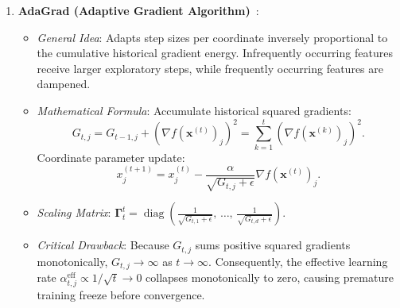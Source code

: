 \begin{enumerate}
  \item \textbf{AdaGrad (Adaptive Gradient Algorithm)}~\cite{duchi2011adaptive}:
    \begin{itemize}[noitemsep]
      \item \textit{General Idea}: Adapts step sizes per coordinate inversely proportional to the cumulative historical gradient energy. Infrequently occurring features receive larger exploratory steps, while frequently occurring features are dampened.
      \item \textit{Mathematical Formula}:
        Accumulate historical squared gradients:
        \begin{equation}
        G_{t, j} = G_{t-1, j} + \left( \nabla f(\mathbf{x}^{(t)})_j \right)^2 = \sum_{k=1}^t \left( \nabla f(\mathbf{x}^{(k)})_j \right)^2.
        \end{equation}
        Coordinate parameter update:
        \begin{equation}
        x_j^{(t+1)} = x_j^{(t)} - \frac{\alpha}{\sqrt{G_{t, j} + \epsilon}} \nabla f(\mathbf{x}^{(t)})_j.
        \end{equation}
      \item \textit{Scaling Matrix}: $\boldsymbol{\Gamma}_t^t = \operatorname{diag}\left( \frac{1}{\sqrt{G_{t, 1} + \epsilon}}, \, \dots, \, \frac{1}{\sqrt{G_{t, d} + \epsilon}} \right)$.
      \item \textit{Critical Drawback}: Because $G_{t, j}$ sums positive squared gradients monotonically, $G_{t, j} \to \infty$ as $t \to \infty$. Consequently, the effective learning rate $\alpha_{t, j}^{\text{eff}} \propto 1/\sqrt{t} \to 0$ collapses monotonically to zero, causing premature training freeze before convergence.
    \end{itemize}


\end{enumerate}
